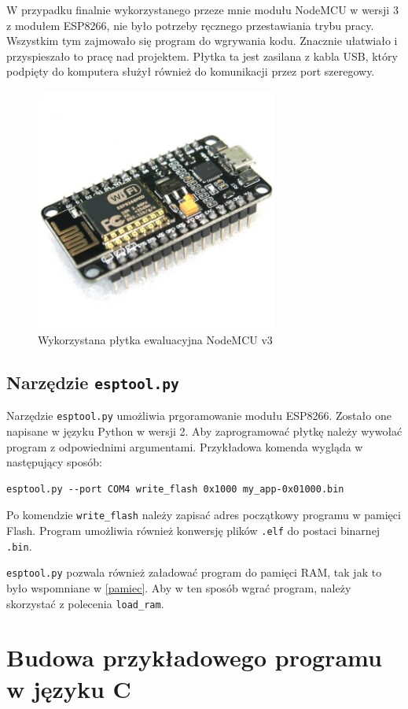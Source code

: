 W przypadku finalnie wykorzystanego przeze mnie modułu NodeMCU w wersji 3 z modułem
ESP8266, nie było potrzeby ręcznego przestawiania trybu pracy. Wszystkim tym zajmowało
się program do wgrywania kodu. Znacznie ułatwiało i przyspieszało to pracę nad projektem.
Płytka ta jest zasilana z kabla USB, który podpięty do komputera służył również do komunikacji
przez port szeregowy.

\begin{figure}[H]
	\centering
    \includegraphics[width=8cm]{./images/nodemcu.jpg}
    \caption{Wykorzystana płytka ewaluacyjna NodeMCU v3}
	\label{esp8266-nodemcu}
\end{figure}
\FloatBarrier

\subsection{Narzędzie \texttt{esptool.py}}
\label{esptool}
Narzędzie \texttt{esptool.py} umożliwia prgoramowanie modułu ESP8266. Zostało one 
napisane w języku Python w wersji 2. Aby zaprogramować płytkę należy wywołać 
program z odpowiednimi argumentami. Przykładowa komenda wygląda w następujący sposób:

\begin{lstlisting}[style=customc,
    frame=single,
    caption={Przykładowa komenda programująca moduł ESP8266},
    captionpos=b,
    label={esptool_basic}]
esptool.py --port COM4 write_flash 0x1000 my_app-0x01000.bin
\end{lstlisting}

Po komendzie \texttt{write\_{}flash} należy zapisać adres początkowy programu w 
pamięci Flash. Program umożliwia również konwersję plików \texttt{.elf} do postaci 
binarnej \texttt{.bin}. 

\texttt{esptool.py} pozwala również załadować program do pamięci RAM, tak jak to było
wspomniane w \ref{pamiec}. Aby w ten sposób wgrać program, należy skorzystać z polecenia 
\texttt{load\_{}ram}.

\section{Budowa przykładowego programu w języku C}
\label{example_C}

